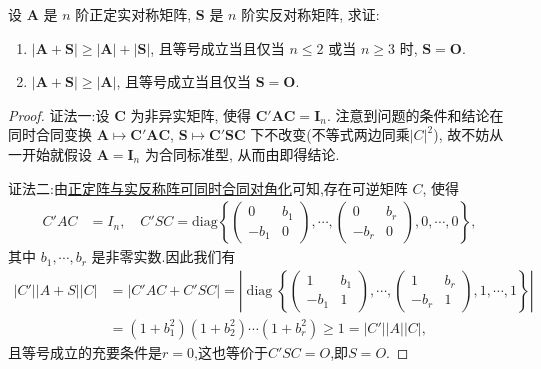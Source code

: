 \documentclass[../../main.tex]{subfiles}%
\begin{document}
\begin{proposition}\label{proposition:A+S的行列式的相关结论}
设 \(\boldsymbol{A}\) 是 \(n\) 阶正定实对称矩阵, \(\boldsymbol{S}\) 是 \(n\) 阶实反对称矩阵, 求证:
\begin{enumerate}[(1)]
\item \(|\boldsymbol{A}+\boldsymbol{S}|\geqslant |\boldsymbol{A}|+|\boldsymbol{S}|\), 且等号成立当且仅当 \(n\leqslant 2\) 或当 \(n\geqslant 3\) 时, \(\boldsymbol{S}=\boldsymbol{O}\).
\item \(|\boldsymbol{A}+\boldsymbol{S}|\geqslant |\boldsymbol{A}|\), 且等号成立当且仅当 \(\boldsymbol{S}=\boldsymbol{O}\).
\end{enumerate}
\end{proposition}
\begin{proof}

{\color{blue}证法一:}设 \(\boldsymbol{C}\) 为非异实矩阵, 使得 \(\boldsymbol{C}'\boldsymbol{A}\boldsymbol{C}=\boldsymbol{I}_n\). 注意到问题的条件和结论在同时合同变换 \(\boldsymbol{A}\mapsto\boldsymbol{C}'\boldsymbol{A}\boldsymbol{C}\), \(\boldsymbol{S}\mapsto\boldsymbol{C}'\boldsymbol{S}\boldsymbol{C}\) 下不改变(不等式两边同乘$|C|^2$), 故不妨从一开始就假设 \(\boldsymbol{A}=\boldsymbol{I}_n\) 为合同标准型, 从而由即得结论. 

{\color{blue}证法二:}由\hyperref[proposition:正定阵与实反称阵可同时合同对角化-例9.114]{正定阵与实反称阵可同时合同对角化}可知,存在可逆矩阵 $C$, 使得
\begin{align*}
C'AC &= I_n,\quad C'SC = \mathrm{diag}\left\{\begin{pmatrix}0 & b_1\\ -b_1 & 0\end{pmatrix},\cdots,\begin{pmatrix}0 & b_r\\ -b_r & 0\end{pmatrix},0,\cdots,0\right\},
\end{align*}
其中 $b_1,\cdots,b_r$ 是非零实数.因此我们有
\begin{align*}
|C'||A + S||C| &= |C'AC + C'SC| = \left| \operatorname{diag}\left\{ \begin{pmatrix} 1 & b_1 \\ -b_1 & 1 \end{pmatrix}, \cdots, \begin{pmatrix} 1 & b_r \\ -b_r & 1 \end{pmatrix}, 1, \cdots, 1 \right\} \right| \\
&= (1 + b_1^2)(1 + b_2^2) \cdots (1 + b_r^2) \geqslant 1 = |C'||A||C|,
\end{align*}
且等号成立的充要条件是\( r = 0 \),这也等价于\( C'SC = O \),即\( S = O \).
\end{proof}
\end{document}
